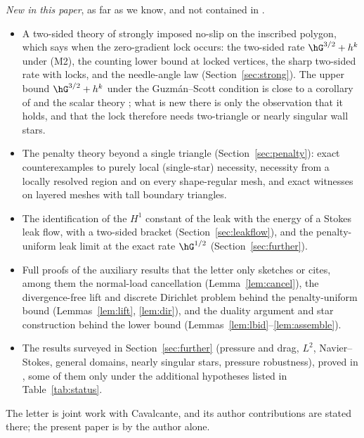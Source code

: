 \emph{New in this paper}, as far as we know, and not contained in \cite{CavalcantePadhiLetter}.
\begin{itemize}
\item A two-sided theory of strongly imposed no-slip on the inscribed polygon, which says when the zero-gradient lock occurs: the two-sided rate $\hG^{3/2}+h^k$ under (M2), the counting lower bound at locked vertices, the sharp two-sided rate with locks, and the needle-angle law (Section~\ref{sec:strong}). The upper bound $\hG^{3/2}+h^k$ under the Guzm\'an--Scott condition is close to a corollary of \cite{GuzmanScott2019} and the scalar theory \cite{BergerScottStrang1972,Scott1975}; what is new there is only the observation that it holds, and that the lock therefore needs two-triangle or nearly singular wall stars.
\item The penalty theory beyond a single triangle (Section~\ref{sec:penalty}): exact counterexamples to purely local (single-star) necessity, necessity from a locally resolved region and on every shape-regular mesh, and exact witnesses on layered meshes with tall boundary triangles.
\item The identification of the $H^1$ constant of the leak with the energy of a Stokes leak flow, with a two-sided bracket (Section~\ref{sec:leakflow}), and the penalty-uniform leak limit at the exact rate $\hG^{1/2}$ (Section~\ref{sec:further}).
\item Full proofs of the auxiliary results that the letter only sketches or cites, among them the normal-load cancellation (Lemma~\ref{lem:cancel}), the divergence-free lift and discrete Dirichlet problem behind the penalty-uniform bound (Lemmas~\ref{lem:lift}, \ref{lem:dir}), and the duality argument and star construction behind the lower bound (Lemmas~\ref{lem:lbid}--\ref{lem:assemble}).
\item The results surveyed in Section~\ref{sec:further} (pressure and drag, $L^2$, Navier--Stokes, general domains, nearly singular stars, pressure robustness), proved in \cite{PadhiExt}, some of them only under the additional hypotheses listed in Table~\ref{tab:status}.
\end{itemize}
The letter is joint work with Cavalcante, and its author contributions are stated there; the present paper is by the author alone.
